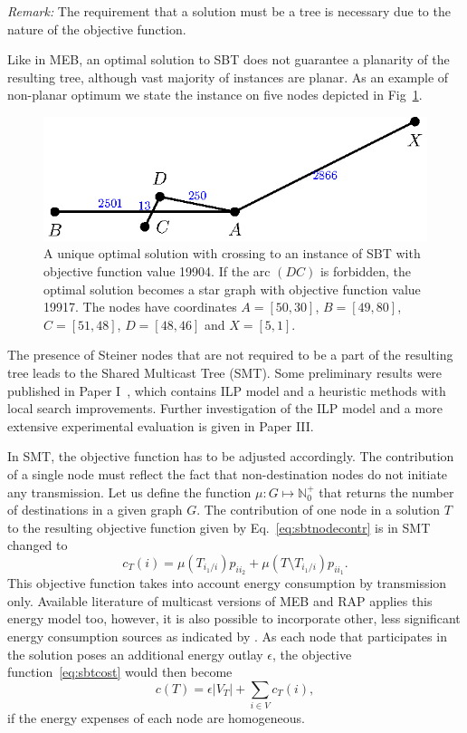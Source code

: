 \emph{Remark:} The requirement that a solution must be a tree is necessary due to the nature of the objective function.

Like in MEB, an optimal solution to SBT does not guarantee a planarity of the resulting tree, although vast majority of instances are planar. 
As an example of non-planar optimum we state the instance on five nodes depicted in Fig~\ref{fig:sbtnonplanar}.
\begin{figure}[htb!]
  \centering
  \includegraphics[scale=1.4]{figurer/sbtnonplanar.eps}
  \caption{A unique optimal solution with crossing to an instance of SBT with objective function value 19904. 
  If the arc $(DC)$ is forbidden, the optimal solution becomes a star graph with objective function value 19917.
  The nodes have coordinates $A=[50,30]$, $B=[49,80]$, $C=[51,48]$, $D=[48,46]$ and $X=[5,1]$.}
  \label{fig:sbtnonplanar}
\end{figure}

The presence of Steiner nodes that are not required to be a part of the resulting tree leads to the Shared Multicast Tree (SMT).
Some preliminary results were published in Paper I~\cite{ivanova16}, which contains ILP model and a heuristic methods with local search improvements.
Further investigation of the ILP model and a more extensive experimental evaluation is given in Paper III.

In SMT, the objective function has to be adjusted accordingly. 
The contribution of a single node must reflect the fact that non-destination nodes do not initiate any transmission.
Let us define the function $\mu: G\mapsto \mathbb{N}^+_0$ that returns the number of destinations in a given graph $G$.
The contribution of one node in a solution $T$ to the resulting objective function given by Eq.~\ref{eq:sbtnodecontr} is in SMT changed to 
\begin{equation}\label{eq:smtnodecontr}
c_T(i)=\mu(T_{i_1/i})p_{ii_2} + \mu(T\setminus T_{i_1/i})p_{ii_1}.
\end{equation}
This objective function takes into account energy consumption by transmission only.
Available literature of multicast versions of MEB and RAP applies this energy model too, however, it is also possible to incorporate other,
less significant energy consumption sources as indicated by \cite{halgamuge09}.
As each node that participates in the solution poses an additional energy outlay $\epsilon$, the objective function~\ref{eq:sbtcost} would then become
\begin{equation}
c(T)=\epsilon|V_T|+\sum\limits_{i\in V}c_T(i),
\label{eq:smtcostB}
\end{equation}
if the energy expenses of each node are homogeneous. 

